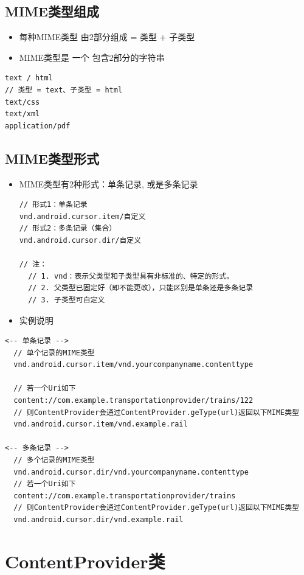 \documentclass[9pt, b5paaper]{book}
\begin{document}
\subsection{MIME类型组成}
\label{sec-5-2-2}
\begin{itemize}
\item 每种MIME类型 由2部分组成 = 类型 + 子类型
\item MIME类型是 一个 包含2部分的字符串
\end{itemize}
\begin{verbatim}
text / html
// 类型 = text、子类型 = html
text/css
text/xml
application/pdf
\end{verbatim}

\subsection{MIME类型形式}
\label{sec-5-2-3}
\begin{itemize}
\item MIME类型有2种形式：单条记录, 或是多条记录
\begin{verbatim}
// 形式1：单条记录  
vnd.android.cursor.item/自定义
// 形式2：多条记录（集合）
vnd.android.cursor.dir/自定义 

// 注：
  // 1. vnd：表示父类型和子类型具有非标准的、特定的形式。
  // 2. 父类型已固定好（即不能更改），只能区别是单条还是多条记录
  // 3. 子类型可自定义
\end{verbatim}
\item 实例说明
\end{itemize}
\begin{verbatim}
<-- 单条记录 -->
  // 单个记录的MIME类型
  vnd.android.cursor.item/vnd.yourcompanyname.contenttype 

  // 若一个Uri如下
  content://com.example.transportationprovider/trains/122   
  // 则ContentProvider会通过ContentProvider.geType(url)返回以下MIME类型
  vnd.android.cursor.item/vnd.example.rail

<-- 多条记录 -->
  // 多个记录的MIME类型
  vnd.android.cursor.dir/vnd.yourcompanyname.contenttype 
  // 若一个Uri如下
  content://com.example.transportationprovider/trains 
  // 则ContentProvider会通过ContentProvider.geType(url)返回以下MIME类型
  vnd.android.cursor.dir/vnd.example.rail
\end{verbatim}

\section{ContentProvider类}
\label{sec-5-3}
\end{document}
